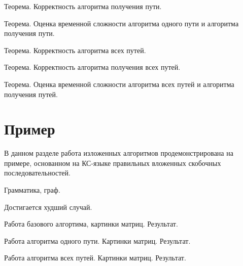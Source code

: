 Теорема. Корректность алгоритма получения пути.

Теорема. Оценка временной сложности алгоритма одного пути и алгоритма получения пути.

Теорема. Корректность алгоритма всех путей.

Теорема. Корректность алгоритма получения всех путей.

Теорема. Оценка временной сложности алгоритма всех путей и алгоритма получения путей.

\section{Пример}\label{sec:ch4/sect3}
В данном разделе работа изложенных алгоритмов продемонстрирована на примере, основанном на КС-языке правильных вложенных скобочных последовательностей.

Грамматика, граф.

Достигается худший случай.

Работа базового алгортима, картинки матриц. Результат.

Работа алгоритма одного пути. Картинки матриц. Результат.

Работа алгоритма всех путей. Картинки матриц. Результат.

\clearpage

